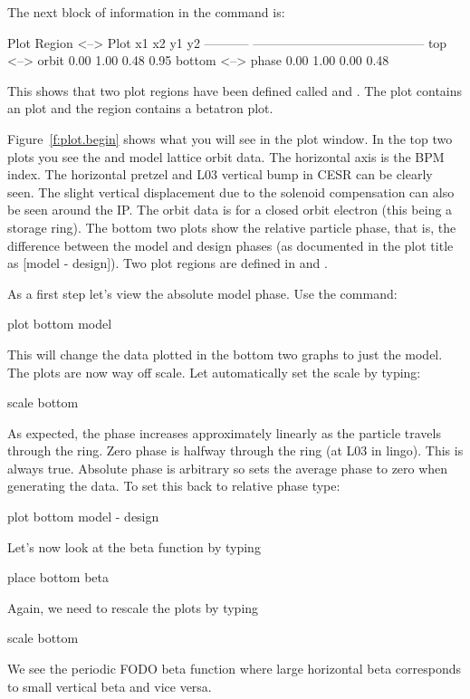 The next block of information in the  command is:
\begin{example}
  Plot Region         <-->  Plot                 x1    x2    y1    y2
  -----------               -----------------------------------------
  top                 <-->  orbit               0.00  1.00  0.48  0.95
  bottom              <-->  phase               0.00  1.00  0.00  0.48
\end{example}
This shows that two plot regions have been defined called  and
. The  plot contains an  plot and
the  region contains a betatron  plot.

Figure~\ref{f:plot.begin} shows what you will see in the plot
window. In the top two plots you see the  and  model
lattice orbit data. The horizontal axis is the \cesr BPM index. The
horizontal pretzel and L03 vertical bump in CESR can be clearly
seen. The slight vertical displacement due to the solenoid
compensation can also be seen around the IP. The orbit data is for a
closed orbit electron (this being a storage ring). The bottom two
plots show the relative particle phase, that is, the difference
between the model and design phases (as documented in the plot title
as [model - design]). Two plot regions are defined in \tao
{} and .

As a first step let's view the absolute model phase. Use the command:
\begin{example}
  plot bottom model
\end{example}
This will change the data plotted in the bottom two graphs to just the
model.  The plots are now way off scale. Let \tao automatically set
the scale by typing:
\begin{example}
  scale bottom
\end{example}
As expected, the phase increases approximately linearly as the
particle travels through the ring. Zero phase is halfway through the
ring (at L03 in \cesr lingo).  This is always true. Absolute phase is
arbitrary so \tao sets the average phase to zero when generating the
data. To set this back to relative phase type:
\begin{example}
  plot bottom model - design
\end{example}

Let's now look at the beta function by typing
\begin{example}
  place bottom beta
\end{example}
Again, we need to rescale the plots by typing
\begin{example}
  scale bottom
\end{example}
We see the periodic FODO beta function where large horizontal beta
corresponds to small vertical beta and vice versa.

